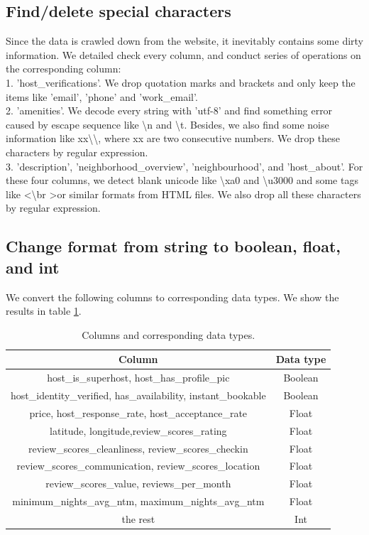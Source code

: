 \documentclass{article}
\begin{document}
	\subsection{Find/delete special characters}
	Since the data is crawled down from the website, it inevitably contains some dirty information. We detailed check every column, and conduct series of operations on the corresponding column:
	\vspace{3pt}
	\\
	1. 'host\_verifications'. We drop quotation marks and brackets and only keep the items like 'email', 'phone' and 'work\_email'.
	\\
	2. 'amenities'. We decode every string with 'utf-8' and find something error caused by escape sequence like \textbackslash n and \textbackslash t. Besides, we also find some noise information like xx\textbackslash \textbackslash, where xx are two consecutive numbers. We drop these characters by regular expression. 
	\\
	3. 'description', 'neighborhood\_overview', 'neighbourhood', and 'host\_about'. For these four columns, we detect blank unicode like \textbackslash xa0 and \textbackslash u3000 and some tags like \textless \textbackslash br \textgreater or similar formats from HTML files. We also drop all these characters by regular expression. 
	\subsection{Change format from string to boolean, float, and int}
	
	We convert the following columns to corresponding data types. We show the results in table \ref{table:data_type}.
	
	\begin{table}[h]
		\centering 
		\begin{tabular}{cc}
			\toprule
			Column                                                         & Data type \\
			\midrule
			host\_is\_superhost, host\_has\_profile\_pic                   & Boolean   \\
			host\_identity\_verified, has\_availability, instant\_bookable & Boolean   \\
			price, host\_response\_rate, host\_acceptance\_rate            & Float     \\
			latitude, longitude,review\_scores\_rating                     & Float     \\
			review\_scores\_cleanliness, review\_scores\_checkin           & Float     \\
			review\_scores\_communication, review\_scores\_location        & Float     \\
			review\_scores\_value, reviews\_per\_month                     & Float     \\
			minimum\_nights\_avg\_ntm, maximum\_nights\_avg\_ntm           & Float \\
			the rest & Int \\
			\bottomrule
		\end{tabular}
		\caption{Columns and corresponding data types.}\label{table:data_type}
	\end{table}
	
\end{document}
